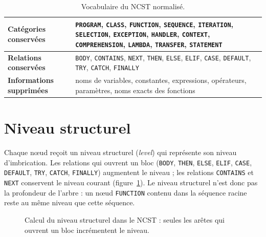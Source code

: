 \documentclass[12pt,a4paper,oneside]{report}
\begin{document}
\begin{table}[htbp]
\centering
\small
\renewcommand{\arraystretch}{1.2}
\begin{tabularx}{\textwidth}{>{\bfseries}p{3.2cm}X}
\toprule
Catégories conservées &
\texttt{PROGRAM}, \texttt{CLASS}, \texttt{FUNCTION}, \texttt{SEQUENCE},
\texttt{ITERATION}, \texttt{SELECTION}, \texttt{EXCEPTION}, \texttt{HANDLER},
\texttt{CONTEXT}, \texttt{COMPREHENSION}, \texttt{LAMBDA}, \texttt{TRANSFER},
\texttt{STATEMENT} \\
\midrule
Relations conservées &
\texttt{BODY}, \texttt{CONTAINS}, \texttt{NEXT}, \texttt{THEN}, \texttt{ELSE},
\texttt{ELIF}, \texttt{CASE}, \texttt{DEFAULT}, \texttt{TRY}, \texttt{CATCH},
\texttt{FINALLY} \\
\midrule
Informations supprimées &
noms de variables, constantes, expressions, opérateurs, paramètres, noms
exacts des fonctions \\
\bottomrule
\end{tabularx}
\caption{Vocabulaire du NCST normalisé.}
\label{tab:ncst_vocab}
\end{table}

\section{Niveau structurel}

Chaque nœud reçoit un niveau structurel (\emph{level}) qui représente son
niveau d'imbrication. Les relations qui ouvrent un bloc (\texttt{BODY},
\texttt{THEN}, \texttt{ELSE}, \texttt{ELIF}, \texttt{CASE}, \texttt{DEFAULT},
\texttt{TRY}, \texttt{CATCH}, \texttt{FINALLY}) augmentent le niveau ; les
relations \texttt{CONTAINS} et \texttt{NEXT} conservent le niveau courant
(figure~\ref{fig:levels}). Le niveau structurel n'est donc pas la profondeur
de l'arbre : un nœud \texttt{FUNCTION} contenu dans la séquence racine reste
au même niveau que cette séquence.

\begin{figure}[htbp]
\centering
{}
\caption{Calcul du niveau structurel dans le NCST : seules les arêtes qui
ouvrent un bloc incrémentent le niveau.}
\label{fig:levels}
\end{figure}
\end{document}
